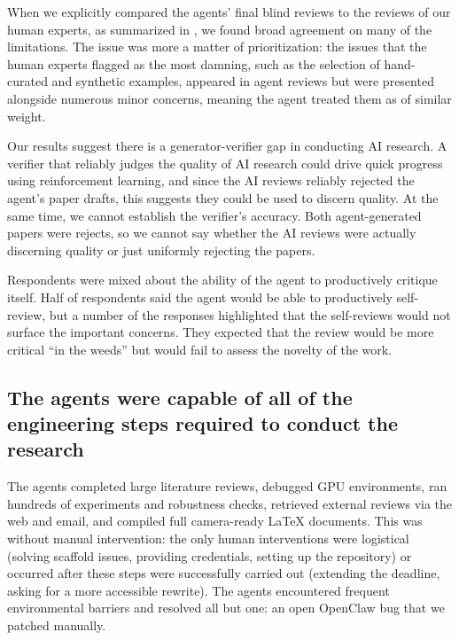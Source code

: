 When we explicitly compared the agents' final blind reviews to the reviews of
our human experts, as summarized in , we found
broad agreement on many of the limitations. The
issue was more a matter of prioritization: the issues that the human experts
flagged as the most damning, such as the selection of hand-curated and
synthetic examples, appeared in agent reviews but were presented alongside numerous
minor concerns, meaning the agent treated them as of similar weight.

Our results suggest there is a generator-verifier gap in conducting AI research. A verifier that reliably judges the quality of AI research could drive quick progress using reinforcement learning, and since the AI reviews reliably rejected the agent's paper drafts, this suggests they could be used to discern quality. At the same time, we cannot establish the verifier's accuracy. Both agent-generated papers were rejects, so we cannot say whether the AI reviews were actually discerning quality or just uniformly rejecting the papers.

Respondents were mixed about the ability of the agent to productively critique
itself. Half of respondents said the agent would be able to productively
self-review, but a number of the responses highlighted that the self-reviews
would not surface the important concerns. They expected that the review would
be more critical ``in the weeds'' but would fail to assess the novelty of the
work.

\begin{table}[h]
  \centering
  \caption{Detailed comparison of the human experts' and agents' final reviews
  of the agents' work.}
  \label{tab:expert-self-review}
  
\end{table}

\subsection{The agents were capable of all of the engineering steps required
to conduct the research}

The agents completed large literature reviews, debugged GPU environments, ran
hundreds of experiments and robustness checks, retrieved external reviews via
the web and email, and compiled full camera-ready \LaTeX{} documents. This was
without manual intervention: the only human interventions were logistical
(solving scaffold issues, providing credentials, setting up the repository) or
occurred after these steps were successfully carried out (extending the
deadline, asking for a more accessible rewrite). The agents encountered frequent
environmental barriers and resolved all but one: an open OpenClaw bug that we
patched manually.

